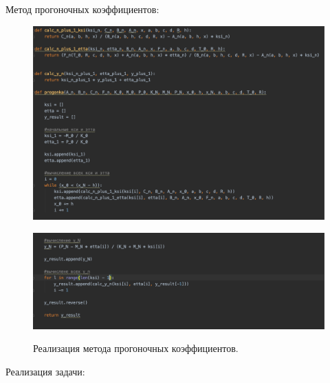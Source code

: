 \documentclass[a4paper,12pt]{article}
\begin{document}
	Метод прогоночных коэффициентов:
	
	\begin{figure}[h!]
		\begin{center}
			{\includegraphics[scale = 0.6]{progonka1.png}}
		\end{center}
		\label{progonka1}
	\end{figure}
	
	\begin{figure}[h!]
		\begin{center}
			{\includegraphics[scale = 0.6]{progonka2.png}}
		\end{center}
		\caption{Реализация метода прогоночных коэффициентов.}
		\label{progonka2}
	\end{figure}

	\newpage
	
	Реализация задачи:
	
\end{document}
